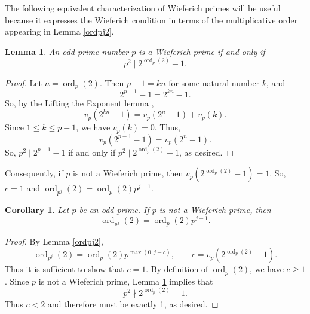 \documentclass[a4paper]{article}
\newtheorem{lemma}[theorem]{Lemma}
\newtheorem{corollary}[theorem]{Corollary}
\newcommand{\ord}[2][]{\operatorname{ord}_{#1}\!\left( #2 \right)}
\begin{document}
	The following equivalent characterization of Wieferich primes will be useful because it expresses the Wieferich condition in terms of the multiplicative order appearing in Lemma \ref{ordpj2}.
	\begin{lemma}\label{wieferichEquivalence}
		An odd prime number $p$ is a Wieferich prime if and only if
		\begin{equation*}
			p^2 \mid 2^{\ord[p]{2}} - 1.
		\end{equation*}
	\end{lemma}
	\begin{proof}
		Let $n = \ord[p]{2}$.
		Then $p-1 = kn$ for some natural number $k$, and
		\begin{equation*}
			2^{p-1} - 1 = 2^{kn} - 1.
		\end{equation*}
		So, by the Lifting the Exponent lemma \cite[Chapter 2 Section 2.7]{ireland_rosen_1990},
		\begin{equation*}
			v_p(2^{kn} - 1) = v_p(2^n - 1) + v_p(k).
		\end{equation*}
		Since $1 \leq k \leq p-1$, we have $v_p(k) = 0$.
		Thus,
		\begin{equation*}
			v_p(2^{p-1} - 1) = v_p(2^n - 1).
		\end{equation*}
		So, $p^2 \mid 2^{p-1} - 1$ if and only if $p^2 \mid 2^{\ord[p]{2}} - 1$, as desired.
	\end{proof}
	Consequently, if $p$ is not a Wieferich prime, then $v_p(2^{\ord[p]{2}} - 1) = 1$.
	So, $c = 1$ and $\ord[p^j]{2} = \ord[p]{2} p^{j-1}$.

	\begin{corollary}\label{nonWieferichOrd}
		Let $p$ be an odd prime.
		If $p$ is not a Wieferich prime, then
		\begin{equation*}
			\ord[p^j]{2} = \ord[p]{2} p^{j-1}.
		\end{equation*}
	\end{corollary}
	\begin{proof}
		By Lemma \ref{ordpj2},
		\begin{equation*}
			\ord[p^j]{2} = \ord[p]{2} p^{\max{(0, j-c)}}, \qquad c = v_p(2^{\ord[p]{2}} - 1).
		\end{equation*}
		Thus it is sufficient to show that $c=1$.
		By definition of $\ord[p]{2}$, we have $c \geq 1$.
		Since $p$ is not a Wieferich prime, Lemma \ref{wieferichEquivalence} implies that
		\begin{equation*}
			p^2 \nmid 2^{\ord[p]{2}} - 1.
		\end{equation*}
		Thus $c < 2$ and therefore must be exactly 1, as desired.
	\end{proof}
	
\end{document}
